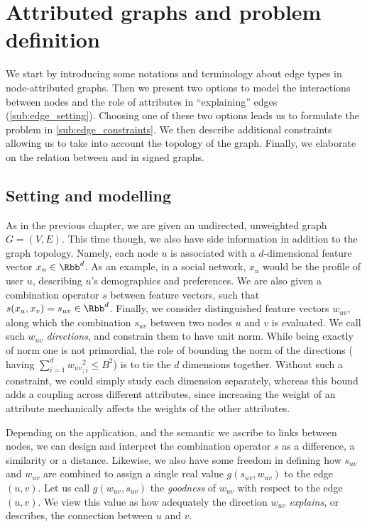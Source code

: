 \section{Attributed graphs and problem definition}
\label{sec:edge_problem}

We start by introducing some notations and terminology about edge types in node-attributed graphs.
Then we present two options to model the interactions between nodes and the role of attributes in
\enquote{explaining} edges (\autoref{sub:edge_setting}). Choosing one of these two options leads us to
formulate the \ecp{} problem in \autoref{sub:edge_constraints}. We then describe additional
constraints allowing us to take into account the topology of the graph. Finally, we elaborate on the relation
between \ecp{} and \esp{} in signed graphs.

\subsection{Setting and modelling}
\label{sub:edge_setting}

As in the previous chapter, we are given an undirected, unweighted graph $G=(V,E)$. This
time though, we also have side information in addition to the graph topology. Namely, each node $u$
is associated with a $d$-dimensional feature vector $x_u \in \Rbb^d$. As an example, in a social
network, $x_u$ would be the profile of user $u$, describing $u$'s demographics and preferences. We
are also given a combination operator $s$ between feature vectors, such that $s(x_u, x_v) = s_{uv}
\in \Rbb^d$. Finally, we consider distinguished feature vectors $w_{uv}$,
along which the combination $s_{uv}$ between two nodes $u$ and $v$ is evaluated. We call such
$w_{uv}$ \emph{directions}, and constrain them to have unit norm.
While being exactly of norm one is not primordial, the role of bounding the norm of the directions
(\ie{} having $\sum_{i=1}^d {w_{uv}}_{;i}^2 \leq B^2$) is to tie the $d$ dimensions together.
Without such a constraint, we could simply study each dimension separately, whereas this bound
adds a coupling across different attributes, since increasing the weight of an attribute mechanically
affects the weights of the other attributes.

Depending on the application, and the semantic we ascribe to links between nodes, we can design and
interpret the combination operator $s$ as a difference, a similarity or a distance. Likewise, we
also have some freedom in defining how $s_{uv}$ and $w_{uv}$ are combined to assign a single real
value $g(s_{uv}, w_{uv})$ to the edge $(u,v)$. Let us call $g(w_{uv}, s_{uv})$ the \emph{goodness}
of $w_{uv}$ with respect to the edge $(u,v)$. We view this value as how adequately the direction
$w_{uv}$ \emph{explains}, or describes, the connection between $u$ and $v$.

